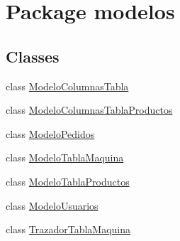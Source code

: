 \hypertarget{namespacemodelos}{}\section{Package modelos}
\label{namespacemodelos}
\subsection*{Classes}
\begin{DoxyCompactItemize}
\item 
class \mbox{\hyperlink{classmodelos_1_1_modelo_columnas_tabla}{Modelo\+Columnas\+Tabla}}
\item 
class \mbox{\hyperlink{classmodelos_1_1_modelo_columnas_tabla_productos}{Modelo\+Columnas\+Tabla\+Productos}}
\item 
class \mbox{\hyperlink{classmodelos_1_1_modelo_pedidos}{Modelo\+Pedidos}}
\item 
class \mbox{\hyperlink{classmodelos_1_1_modelo_tabla_maquina}{Modelo\+Tabla\+Maquina}}
\item 
class \mbox{\hyperlink{classmodelos_1_1_modelo_tabla_productos}{Modelo\+Tabla\+Productos}}
\item 
class \mbox{\hyperlink{classmodelos_1_1_modelo_usuarios}{Modelo\+Usuarios}}
\item 
class \mbox{\hyperlink{classmodelos_1_1_trazador_tabla_maquina}{Trazador\+Tabla\+Maquina}}
\end{DoxyCompactItemize}
